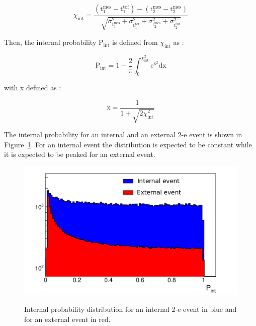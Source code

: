 \documentclass[main.tex]{subfiles}
\begin{document}
\begin{equation}
\chi_{\text{int}} = \frac{(\text{t}_\text{1}^{\text{mes}} - \text{t}_\text{1}^{\text{tof}}) - (\text{t}_\text{2}^{\text{mes}} - \text{t}_\text{2}^{\text{mes}} ) }{\sqrt{ \sigma^{\text{2}}_{\text{t}_\text{1}^{\text{mes}}} + \sigma^{\text{2}}_{\text{t}_\text{1}^{\text{tof}}} + \sigma^{\text{2}}_{\text{t}_\text{2}^{\text{mes}}} + \sigma^{\text{2}}_{\text{t}_\text{2}^{\text{tof}}}  }}
\end{equation}


\NI Then, the internal probability P$_{\text{int}}$ is defined from $\chi_{\text{int}}$ as : 


\begin{equation}\label{eq:probaDef}
\text{P}_{\text{int}} = \text{1} - \frac{\text{2}}{\pi} \int_\text{0}^{\chi^\text{2}_{\text{int}}} \text{e}^{\text{x}^\text{2}} \text{dx}
\end{equation}


\NI with x defined as :

\begin{equation}
\text{x} = \frac{\text{1}}{\text{1}+\sqrt{\text{2}\chi^\text{2}_{\text{int}}}}
\end{equation}


\NI The internal probability for an internal and an external 2-e event is shown in Figure~\ref{PintforIntandExt}. For an internal event the distribution is expected to be constant while it is expected to be peaked for an external event.


\begin{figure}[h!]
\centering
\includegraphics[scale=0.55]{pictures/Chap6/Pint_explication.pdf}
\label{PintforIntandExt}
\caption{Internal probability distribution for an internal 2-e event in blue and for an external event in red.}
\end{figure}
\end{document}
